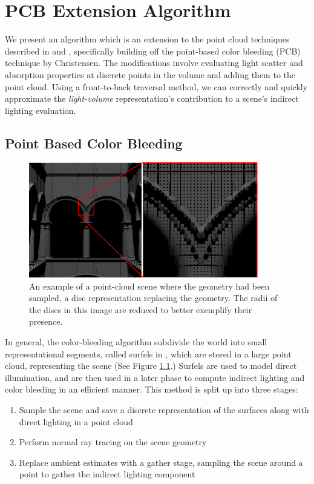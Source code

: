 \documentclass[12pt]{ucthesis}
\begin{document}
\chapter{PCB Extension Algorithm}
\label{algorithm_sec}
We present an algorithm which is an extension to the point cloud techniques described in \cite{tabellion} and \cite{christensen:2008}, specifically building off the point-based color bleeding (PCB) technique by Christensen.  The modifications involve evaluating light scatter and absorption properties at discrete points in the volume and adding them to the point cloud.  Using a front-to-back traversal method, we can correctly and quickly approximate the \textit{light-volume} representation's contribution to a scene's indirect lighting evaluation.

\section{Point Based Color Bleeding}

\begin{figure}[h!]
    \centering
    \includegraphics[width=100mm]{img/pcloud.png}
    \caption{An example of a point-cloud scene where the geometry had been sampled, a disc representation replacing the geometry.  The radii of the discs in this image are reduced to better exemplify their presence.}
    \label{fig:pcloud}
\end{figure}

In general, the color-bleeding algorithm subdivide the world into small representational segments, called surfels in \cite{christensen:2008}, which are stored in a large point cloud, representing the scene (See Figure \ref{fig:pcloud}.)  Surfels are used to model direct illumination, and are then used in a later phase to compute indirect lighting and color bleeding in an efficient manner.  This method is split up into three stages:

\begin{enumerate}
\item Sample the scene and save a discrete representation of the surfaces along with direct lighting in a point cloud
\item Perform normal ray tracing on the scene geometry
\item Replace ambient estimates with a gather stage, sampling the scene around a point to gather the indirect lighting component
\end{enumerate}
\end{document}
